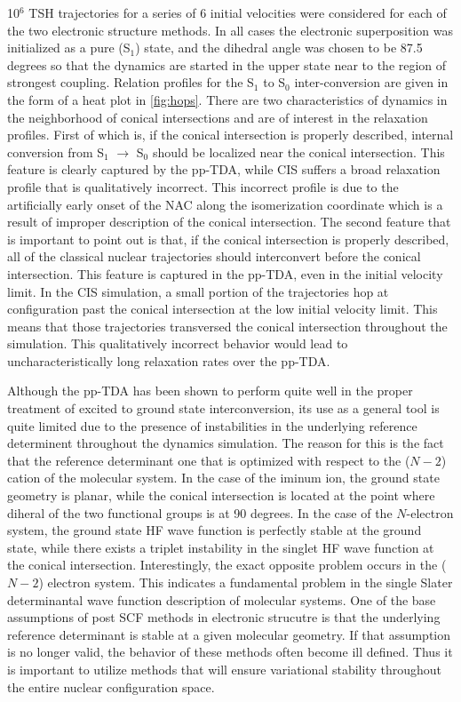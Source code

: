 10$^6$ TSH trajectories for a series of 6 initial velocities were considered for
each of the two electronic structure methods.  In all cases the electronic
superposition was initialized as a pure (S$_1$) state, and the dihedral angle
was chosen to be 87.5 degrees so that the dynamics are started in the upper
state near to the region of strongest coupling. Relation profiles for the S$_1$
to S$_0$ inter-conversion are given in the form of a heat plot in
\cref{fig:hops}. There are two characteristics of dynamics in the neighborhood
of conical intersections and are of interest in the relaxation
profiles\cite{Hynes14_97}. First of which is, if the conical intersection is
properly described, internal conversion from S$_1$ $\rightarrow$ S$_0$ should be
localized near the conical intersection. This feature is clearly captured by
the pp-TDA, while CIS suffers a broad relaxation profile that is qualitatively
incorrect. This incorrect profile is due to the artificially early onset of the
NAC along the isomerization coordinate which is a result of improper description
of the conical intersection. The second feature that is important to point out
is that, if the conical intersection is properly described, all of the classical
nuclear trajectories should interconvert before the conical intersection. This
feature is captured in the pp-TDA, even in the initial velocity limit. In the
CIS simulation, a small portion of the trajectories hop at configuration past
the conical intersection at the low initial velocity limit. This means that
those trajectories transversed the conical intersection throughout the
simulation. This qualitatively incorrect behavior would lead to
uncharacteristically long relaxation rates over the pp-TDA.

Although the pp-TDA has been shown to perform quite well in the proper treatment
of excited to ground state interconversion, its use as a general tool is quite
limited due to the presence of instabilities in the underlying reference
determinent throughout the dynamics simulation. The reason for this is the fact
that the reference determinant one that is optimized with respect to the ($N-2$)
cation of the molecular system. In the case of the iminum ion, the ground state
geometry is planar, while the conical intersection is located at the point where
diheral of the two functional groups is at 90 degrees. In the case of the
$N$-electron system, the ground state HF wave function is perfectly stable at
the ground state, while there exists a triplet instability in the singlet HF
wave function at the conical intersection. Interestingly, the exact opposite
problem occurs in the ($N-2$) electron system. This indicates a fundamental
problem in the single Slater determinantal wave function description of
molecular systems. One of the base assumptions of post SCF methods in electronic
strucutre is that the underlying reference determinant is stable at a given
molecular geometry. If that assumption is no longer valid, the behavior of
these methods often become ill defined. Thus it is important to utilize methods
that will ensure variational stability throughout the entire nuclear
configuration space.

